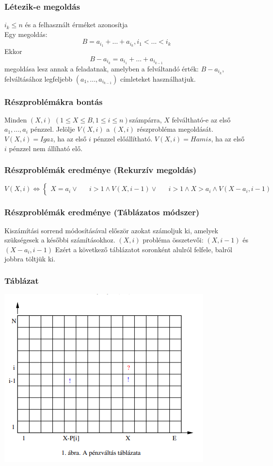 \documentclass{beamer}
\begin{document}
\begin{frame}
    \frametitle{Létezik-e megoldás}
    $i_k \le n$ és a felhasznált érméket azonosítja\\
    Egy megoldás:
    \[B = a_{i_1} + \dots + a_{i_k}, i_1 < ... <i_k\] \newline
    Ekkor 
    \[B-a_{i_k} = a_{i_1} + \dots + a_{i_{k-1}}\]
    megoldása lesz annak a feladatnak, amelyben a felváltandó érték: \(B-a_{i_k}\),
     felváltásához legfeljebb \((a_1,...,a_{i_{k-1}})\) címleteket használhatjuk.
\end{frame}
\begin{frame}
    \frametitle{Részproblémákra bontás}
    Minden \((X,i)\) \((1 \leq X \leq B, 1 \leq i \leq n)\)számpárra,
    \(X\) felváltható-e az első \(a_1,...,a_i\) pénzzel. \newline
    Jelölje $V(X,i)$ a $(X,i)$ részprobléma megoldását.\\
    \(V(X,i) = Igaz\), ha az első \(i\) pénzzel előállítható.   \newline
    \(V(X,i) = Hamis\), ha az első \(i\) pénzzel nem állíható elő.
\end{frame}
\begin{frame}
    \frametitle{Részproblémák eredménye (Rekurzív megoldás)}
    \[
        V(X,i) \Leftrightarrow
    \begin{cases}
        X=a_i\vee &&
        i>1\wedge V(X,i-1)\vee&&
        i>1\wedge X>a_i\wedge V(X-a_i,i-1)&&
    \end{cases}
    \]
\end{frame}
\begin{frame}
    \frametitle{Részproblémák eredménye (Táblázatos módszer)}
    Kiszámítási sorrend módosításával először azokat számoljuk ki, amelyek szükségesek
    a későbbi számításokhoz. \newline
    \((X,i)\) probléma összetevői: \((X,i-1)\) és \((X-a_i,i-1)\) \newline
    Ezért a következő táblázatot soronként alulról felfele, balról jobbra töltjük ki.
\end{frame}
\begin{frame}
    \frametitle{Táblázat}
    \centering
    \includegraphics[scale=0.6]{table.png}
\end{frame}
\end{document}
